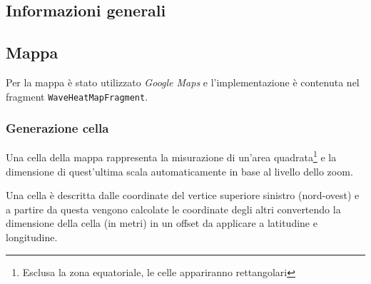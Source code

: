 \documentclass[11pt]{article}
\begin{document}
\subsection{Informazioni generali}



\subsection{Mappa}
Per la mappa è stato utilizzato \textit{Google Maps} e l'implementazione è contenuta nel fragment \texttt{WaveHeatMapFragment}.

\subsubsection{Generazione cella}
Una cella della mappa rappresenta la misurazione di un'area quadrata\footnote{Esclusa la zona equatoriale, le celle appariranno rettangolari} e la dimensione di quest'ultima scala automaticamente in base al livello dello zoom.

Una cella è descritta dalle coordinate del vertice superiore sinistro (nord-ovest) e a partire da questa vengono calcolate le coordinate degli altri convertendo la dimensione della cella (in metri) in un offset da applicare a latitudine e longitudine.
\end{document}
